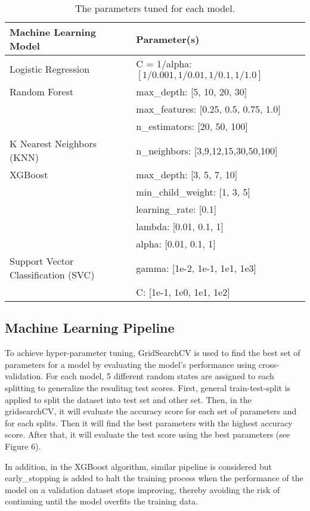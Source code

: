 \documentclass{article}
\begin{document}
\begin{table}[h]
\centering
\begin{tabular}{l|l}
\textbf{Machine Learning Model} & \textbf{Parameter(s)} \\\hline
Logistic Regression & C = 1/alpha: $[1/0.001, 1/0.01, 1/0.1, 1/1.0]$\\ \hline
Random Forest & max\_depth: [5, 10, 20, 30] \\
 & max\_features: [0.25, 0.5, 0.75, 1.0] \\
 & n\_estimators: [20, 50, 100] \\ \hline
K Nearest Neighbors (KNN) & n\_neighbors: [3,9,12,15,30,50,100] \\ \hline
XGBoost & max\_depth: [3, 5, 7, 10] \\
 & min\_child\_weight: [1, 3, 5] \\
 & learning\_rate: [0.1] \\
 & lambda: [0.01, 0.1, 1] \\
 & alpha: [0.01, 0.1, 1] \\ \hline
Support Vector Classification (SVC) &  gamma: [1e-2, 1e-1, 1e1, 1e3] \\
 & C: [1e-1, 1e0, 1e1, 1e2] \\
\end{tabular}
\caption{\label{tab:widgets} The parameters tuned for each model.}
\end{table}

\subsection{Machine Learning Pipeline}
\hspace{0.5cm} To achieve hyper-parameter tuning, GridSearchCV is used to find the best set of parameters for a model by evaluating the model's performance using cross-validation. For each model, 5 different random states are assigned to each splitting to generalize the resulitng test scores. First, general train-test-split is applied to split the dataset into test set and other set. Then, in the gridsearchCV, it will evaluate the accuracy score for each set of parameters and for each splits. Then it will find the best parameters with the highest accuracy score. After that, it will evaluate the test score using the best parameters (see Figure 6). 

In addition, in the XGBoost algorithm, similar pipeline is considered but early\_stopping is added to halt the training process when the performance of the model on a validation dataset stops improving, thereby avoiding the risk of continuing until the model overfits the training data.
\end{document}
